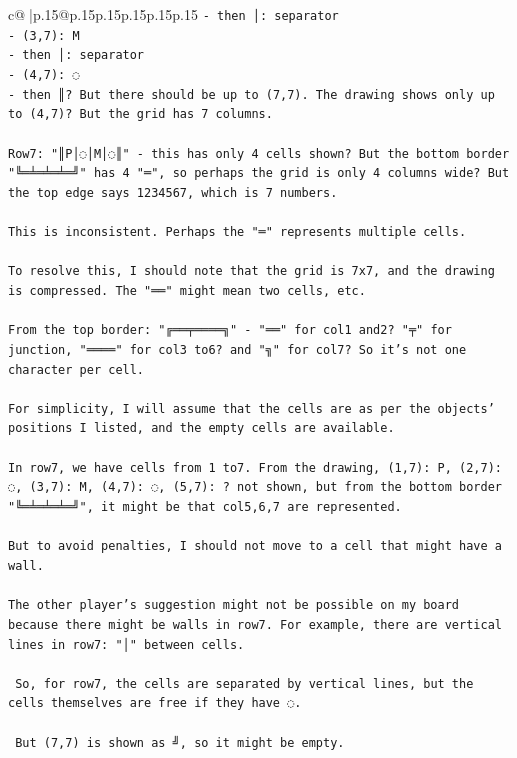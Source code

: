 \documentclass{article}
\begin{document}
{\begin{supertabular}{c@{$\;$}|p{.15\linewidth}@{}p{.15\linewidth}p{.15\linewidth}p{.15\linewidth}p{.15\linewidth}p{.15\linewidth}}
{{{\texttt{{-} then │: separator} \\
\texttt{{-} (3,7): M} \\
\texttt{{-} then │: separator} \\
\texttt{{-} (4,7): ◌} \\
\texttt{{-} then ║? But there should be up to (7,7). The drawing shows only up to (4,7)? But the grid has 7 columns.} \\
\\ 
\texttt{Row7: "║P│◌│M│◌║" {-} this has only 4 cells shown? But the bottom border "╚═╧═╧═╧═╝" has 4 "═", so perhaps the grid is only 4 columns wide? But the top edge says 1234567, which is 7 numbers.} \\
\\ 
\texttt{This is inconsistent. Perhaps the "═" represents multiple cells.} \\
\\ 
\texttt{To resolve this, I should note that the grid is 7x7, and the drawing is compressed. The "══" might mean two cells, etc.} \\
\\ 
\texttt{From the top border: "╔══╤════╗" {-} "══" for col1 and2? "╤" for junction, "════" for col3 to6? and "╗" for col7? So it's not one character per cell.} \\
\\ 
\texttt{For simplicity, I will assume that the cells are as per the objects' positions I listed, and the empty cells are available.} \\
\\ 
\texttt{In row7, we have cells from 1 to7. From the drawing, (1,7): P, (2,7): ◌, (3,7): M, (4,7): ◌, (5,7): ? not shown, but from the bottom border "╚═╧═╧═╧═╝", it might be that col5,6,7 are represented.} \\
\\ 
\texttt{But to avoid penalties, I should not move to a cell that might have a wall.} \\
\\ 
\texttt{The other player's suggestion might not be possible on my board because there might be walls in row7. For example, there are vertical lines in row7: "│" between cells.} \\
\\ 
\texttt{ So, for row7, the cells are separated by vertical lines, but the cells themselves are free if they have ◌.} \\
\\ 
\texttt{ But (7,7) is shown as ╝, so it might be empty.} \\
}}}
\end{supertabular}}
\end{document}
